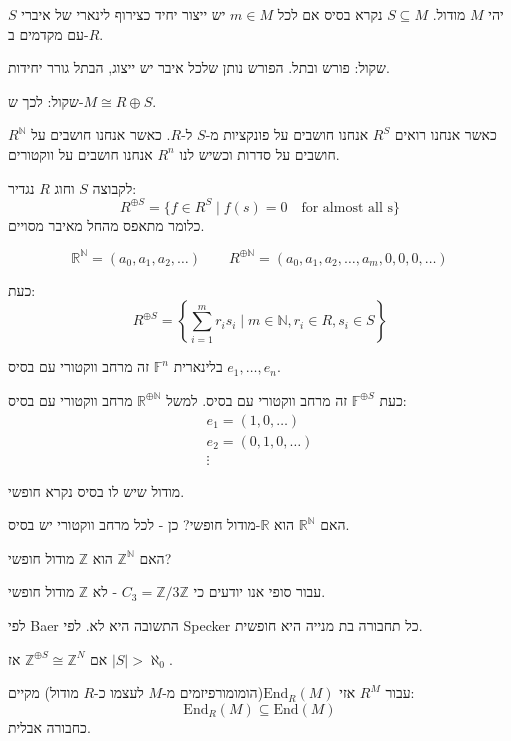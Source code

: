 \documentclass{tstextbook}
\begin{document}
\begin{definition}[בסיס]
יהי \(M\) מודול. \(S\subseteq M\) נקרא בסיס אם לכל \(m \in M\) יש ייצור יחיד כצירוף לינארי של איברי \(S\) עם מקדמים ב-\(R\).

\end{definition}
שקול: פורש ובתל. הפורש נותן שלכל איבר יש ייצוג, הבתל גורר יחידות.

שקול: לכך ש-\(M\cong R \oplus S\). 

\begin{reminder}
כאשר אנחנו רואים \(R^{S}\) אנחנו חושבים על פונקציות מ-\(S\) ל-\(R\). כאשר אנחנו חושבים על \(R^{\mathbb{N}}\) חושבים על סדרות וכשיש לנו \(R^{n}\) אנחנו חושבים על ווקטורים.

\end{reminder}
\begin{definition}
לקבוצה \(S\) וחוג \(R\) נגדיר:
$$R^{\oplus S}=\{ f \in R^{S}\mid  f(s)=0 \quad \text{for almost all s}\}$$
כלומר מתאפס מהחל מאיבר מסויים.

$$\mathbb{R}^{\mathbb{N}}=(a_{0},a_{1},a_{2},\dots)\qquad R^{\oplus \mathbb{N}}=(a_{0},a_{1},a_{2},\dots, a_{m},0,0,0,\dots)$$

\end{definition}
כעת:
$$R^{\oplus S}=\left\{  \sum_{i=1}^{m} r_{i}s_{i}\mid m \in \mathbb{N}, r_{i}\in R, s_{i}\in S  \right\}$$

בלינארית \(\mathbb{F}^{n}\) זה מרחב ווקטורי עם בסיס \(e_{1},\dots, e_{n}\).

כעת \(\mathbb{F}^{\oplus S}\) זה מרחב ווקטורי עם בסיס. למשל \(\mathbb{R}^{\oplus \mathbb{N}}\) מרחב ווקטורי עם בסיס:
\begin{gather*}e_{1}=(1,0,\dots) \\e_{2}=(0,1,0,\dots) \\ \vdots
\end{gather*}

מודול שיש לו בסיס נקרא חופשי.

האם \(\mathbb{R}^{\mathbb{N}}\) הוא \(\mathbb{R}\)-מודול חופשי?
כן - לכל מרחב ווקטורי יש בסיס.

האם \(\mathbb{Z}^{\mathbb{N}}\) הוא \(\mathbb{Z}\) מודול חופשי?

עבור סופי אנו יודעים כי \(C_{3}=\mathbb{Z} / 3\mathbb{Z}\) - לא \(\mathbb{Z}\) מודול חופשי.

לפי Baer התשובה היא לא.
לפי Specker כל תחבורה בת מנייה היא חופשית.

אם \(\mathbb{Z}^{\oplus S}\cong \mathbb{Z}^{N}\) אז \(|S|> \aleph_{0}\). 

עבור \(R^{M}\) אזי \(\mathrm{End}_{R}(M)\)(הומומורפיזמים מ-\(M\) לעצמו כ-\(R\) מודול) מקיים:
$$\mathrm{End}_{R}(M)\subseteq \mathrm{End}(M)$$
כחבורה אבלית.
\end{document}
